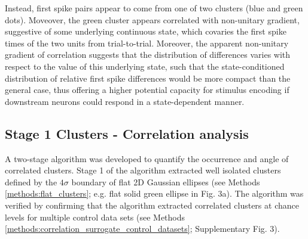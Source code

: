 \documentclass{article}
\begin{document}

Instead, first spike pairs appear to come from one of two clusters (blue and green dots). Moveover, the green cluster appears correlated with non-unitary gradient, suggestive of some underlying continuous state, which covaries the first spike times of the two units from trial-to-trial. Moreover, the apparent non-unitary gradient of correlation suggests that the distribution of differences varies with respect to the value of this underlying state, such that the state-conditioned distribution of relative first spike differences would be more compact than the general case, thus offering a higher potential capacity for stimulus encoding if downstream neurons could respond in a state-dependent manner.




\subsection*{Stage 1 Clusters - Correlation analysis}

A two-stage algorithm was developed to quantify the occurrence and angle of correlated clusters. Stage 1 of the algorithm extracted well isolated clusters defined by the $4\sigma$ boundary of flat 2D Gaussian ellipses (see Methods \ref{methods:flat_clusters}; e.g. flat solid green ellipse in Fig. 3a).
The algorithm was verified by confirming that the algorithm extracted correlated clusters at chance levels for multiple control data sets (see Methods \ref{methods:correlation_surrogate_control_datasets}; Supplementary Fig. 3). 



\end{document}
